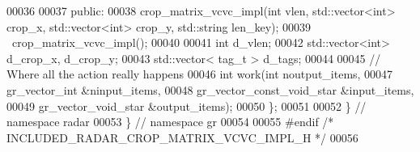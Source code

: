 \begin{DoxyCode}
00036 
00037      \textcolor{keyword}{public}:
00038       crop_matrix_vcvc_impl(\textcolor{keywordtype}{int} vlen, std::vector<int> crop\_x, std::vector<int> crop\_y, 
      std::string len\_key);
00039       ~crop_matrix_vcvc_impl();
00040       
00041       \textcolor{keywordtype}{int} d_vlen;
00042       std::vector<int> d_crop_x, d_crop_y;
00043       std::vector< tag\_t > d_tags;
00044 
00045       \textcolor{comment}{// Where all the action really happens}
00046       \textcolor{keywordtype}{int} work(\textcolor{keywordtype}{int} noutput\_items,
00047                gr\_vector\_int &ninput\_items,
00048                gr\_vector\_const\_void\_star &input\_items,
00049                gr\_vector\_void\_star &output\_items);
00050     \};
00051 
00052   \} \textcolor{comment}{// namespace radar}
00053 \} \textcolor{comment}{// namespace gr}
00054 
00055 \textcolor{preprocessor}{#endif }\textcolor{comment}{/* INCLUDED\_RADAR\_CROP\_MATRIX\_VCVC\_IMPL\_H */}\textcolor{preprocessor}{}
00056 
\end{DoxyCode}
